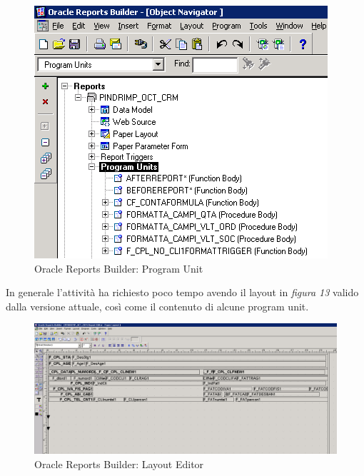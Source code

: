 \begin{figure}[!h]
\thispagestyle{empty}
\centering
\includegraphics[scale=0.85]{img/RepPU.png}
\caption{Oracle Reports Builder: Program Unit}
\end{figure}
In generale l'attività ha richiesto poco tempo avendo il layout in \textit{figura 13} valido dalla versione attuale, così come il contenuto di alcune program unit.
\begin{figure}[!h]
\thispagestyle{empty}
\centering
\includegraphics[scale=0.35]{img/ReportDIA.png}
\caption{Oracle Reports Builder: Layout Editor}
\end{figure}